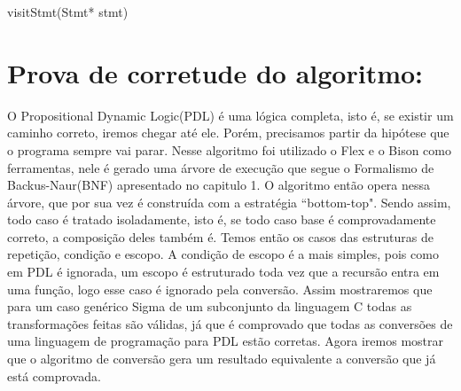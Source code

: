 \documentclass{article}
\begin{document}
	\begin{algorithm}[H]
		
		\caption{visitStmt(Stmt* stmt)}
		
	\end{algorithm}
	
	
	\section{Prova de corretude do algoritmo:}
	\BlankLine
	O Propositional Dynamic Logic(PDL) é uma lógica completa, isto é, se existir um caminho correto, iremos chegar até ele. Porém, precisamos partir da hipótese que o programa sempre vai parar. Nesse algoritmo foi utilizado o Flex e o Bison como ferramentas, nele é gerado uma árvore de execução que segue o Formalismo de Backus-Naur(BNF) apresentado no capitulo 1. O algoritmo então opera nessa árvore, que por sua vez é construída com a estratégia ``bottom-top". Sendo assim, todo caso é tratado isoladamente, isto é, se todo caso base é comprovadamente correto, a composição deles também é. Temos então os casos das estruturas de repetição, condição e escopo. A condição de escopo é a mais simples, pois como em PDL é ignorada, um escopo é estruturado toda vez que a recursão entra em uma função, logo esse caso é ignorado pela conversão. Assim mostraremos que para um caso genérico Sigma de um subconjunto da linguagem C todas as transformações feitas são válidas, já que é comprovado que todas as conversões de uma linguagem de programação para PDL estão corretas. Agora iremos mostrar que o algoritmo de conversão gera um resultado equivalente a conversão que já está comprovada.
	\BlankLine
	
\end{document}
